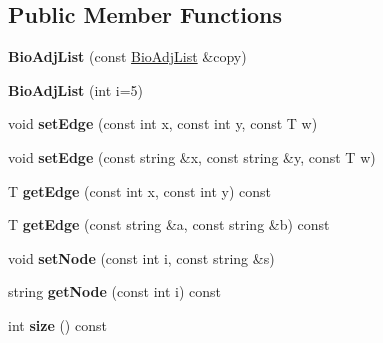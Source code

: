 \subsection*{Public Member Functions}
\begin{DoxyCompactItemize}
\item 
\mbox{\label{class_bio_adj_list_a4597c403282b4db42c5ca993b9bb764a}} 
{\bfseries Bio\+Adj\+List} (const \hyperlink{class_bio_adj_list}{Bio\+Adj\+List} \&copy)
\item 
\mbox{\label{class_bio_adj_list_ad2a8808b11b3dc17553b401ff237dff4}} 
{\bfseries Bio\+Adj\+List} (int i=5)
\item 
\mbox{\label{class_bio_adj_list_a8580717d24e223802bf52c1494691ead}} 
void {\bfseries set\+Edge} (const int x, const int y, const T w)
\item 
\mbox{\label{class_bio_adj_list_a7e8398ed791acacc9c529a87596e9bef}} 
void {\bfseries set\+Edge} (const string \&x, const string \&y, const T w)
\item 
\mbox{\label{class_bio_adj_list_a3f19ee385ef649b18b587e97b32374fe}} 
T {\bfseries get\+Edge} (const int x, const int y) const
\item 
\mbox{\label{class_bio_adj_list_a79e53adb701489a96d2947ac36c91e75}} 
T {\bfseries get\+Edge} (const string \&a, const string \&b) const
\item 
\mbox{\label{class_bio_adj_list_a2128839ac64905df63cc12eac500cbe2}} 
void {\bfseries set\+Node} (const int i, const string \&s)
\item 
\mbox{\label{class_bio_adj_list_a7b1778b7290eb0b9b0e9184e494d2d47}} 
string {\bfseries get\+Node} (const int i) const
\item 
\mbox{\label{class_bio_adj_list_ae5adb02ab6f4c17904f5f828b23600e5}} 
int {\bfseries size} () const
\item 
\mbox{\label{class_bio_adj_list_a4f7848dee4733e33afde1b31092952cd}} 

\end{DoxyCompactItemize}
